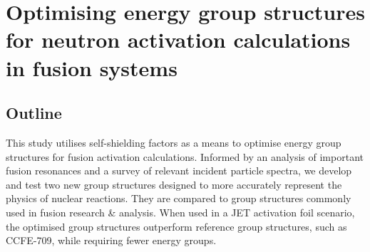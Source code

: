 \chapter{Optimising energy group structures for neutron activation calculations in fusion systems}
\label{chap:group_structure}

\ifpdf
    \graphicspath{{Chapter3/Figs/Raster/}{Chapter3/Figs/PDF/}{Chapter3/Figs/}}
\else
    \graphicspath{{Chapter3/Figs/Vector/}{Chapter3/Figs/}}
\fi


\section{Outline}
\label{sec:outline}

This study utilises self-shielding factors as a means to optimise energy group structures for fusion activation calculations. Informed by an analysis of important fusion resonances and a survey of relevant incident particle spectra, we develop and test two new group structures designed to more accurately represent the physics of nuclear reactions. They are compared to group structures commonly used in fusion research \& analysis. When used in a JET activation foil scenario, the optimised group structures outperform reference group structures, such as CCFE-709, while requiring fewer energy groups.

